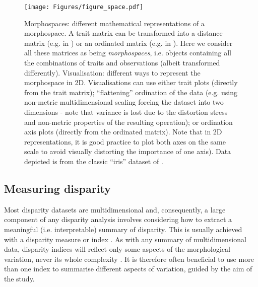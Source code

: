 \documentclass[12pt,letterpaper]{article}
\begin{document}
\begin{figure}[!htbp]
\centering
   \texttt{[image: Figures/figure\_space.pdf]}
\caption{
    Morphospaces: different mathematical representations of a morphospace. A trait matrix can be transformed into a distance matrix (e.g. in \citealt{Close2015}) or an ordinated matrix (e.g. in \citealt{tyler2011detecting}).
    Here we consider all these matrices as being \textit{morphospaces}, i.e. objects containing all the combinations of traits and observations (albeit transformed differently).
    Visualisation: different  ways to represent the morphospace in 2D.
    Visualisations can use either trait plots (directly from the trait matrix); ``flattening'' ordination of the data (e.g. using non-metric multidimensional scaling forcing the dataset into two dimensions - note that variance is lost due to the distortion stress and non-metric properties of the resulting operation); or ordination axis plots (directly from the ordinated matrix).
    Note that in 2D representations, it is good practice to plot both axes on the same scale to avoid visually distorting the importance of one axis). Data depicted is from the classic ``iris'' dataset of \citep{edgar1935irises,fisher1936use}.
}
\label{Fig:morphospace}
\end{figure}

\subsection{Measuring disparity} \label{section:metrics}

Most disparity datasets are multidimensional and, consequently, a large component of any disparity analysis involves considering how to extract a meaningful (i.e.
interpretable) summary of disparity.
This is usually achieved with a disparity measure or index \citep{Hopkins2017}.
As with any summary of multidimensional data, disparity indices will reflect only some aspects of the morphological variation, never its whole complexity \citep{GuillermeMOMS}.
It is therefore often beneficial to use more than one index to summarise different aspects of variation, guided by the aim of the study.
\end{document}

